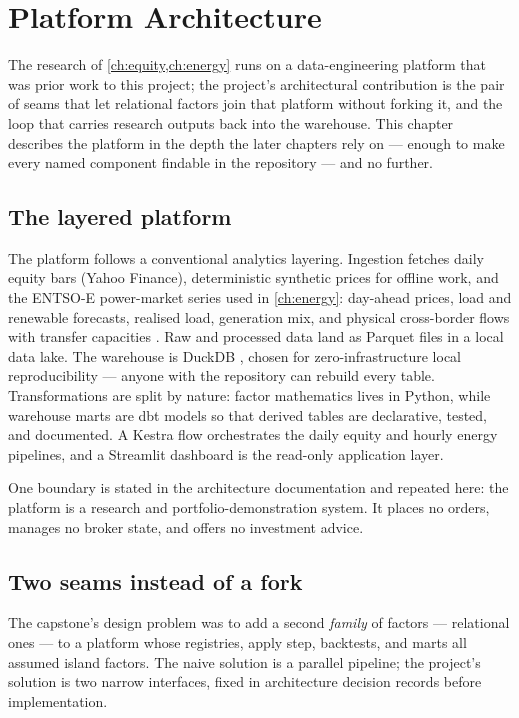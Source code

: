 \chapter{Platform Architecture}
\label{ch:platform}

The research of \cref{ch:equity,ch:energy} runs on a data-engineering
platform that was prior work to this project; the project's architectural
contribution is the pair of seams that let relational factors join that
platform without forking it, and the loop that carries research outputs
back into the warehouse. This chapter describes the platform in the
depth the later chapters rely on --- enough to make every named
component findable in the repository --- and no further.

\section{The layered platform}
\label{sec:pl-layers}

The platform follows a conventional analytics layering. Ingestion
fetches daily equity bars (Yahoo Finance), deterministic synthetic
prices for offline work, and the ENTSO-E power-market series used in
\cref{ch:energy}: day-ahead prices, load and renewable forecasts,
realised load, generation mix, and physical cross-border flows with
transfer capacities \cite{entsoe-tp}. Raw and processed data land as
Parquet files in a local data lake. The warehouse is DuckDB
\cite{raasveldt2019duckdb}, chosen for zero-infrastructure local
reproducibility --- anyone with the repository can rebuild every table.
Transformations are split by nature: factor mathematics lives in Python,
while warehouse marts are dbt models \cite{dbt} so that derived tables
are declarative, tested, and documented. A Kestra flow orchestrates the
daily equity and hourly energy pipelines, and a Streamlit dashboard is
the read-only application layer.

One boundary is stated in the architecture documentation and repeated
here: the platform is a research and portfolio-demonstration system. It
places no orders, manages no broker state, and offers no investment
advice.

\section{Two seams instead of a fork}
\label{sec:pl-seams}

The capstone's design problem was to add a second \emph{family} of
factors --- relational ones --- to a platform whose registries, apply
step, backtests, and marts all assumed island factors. The naive
solution is a parallel pipeline; the project's solution is two narrow
interfaces, fixed in architecture decision records before implementation.

